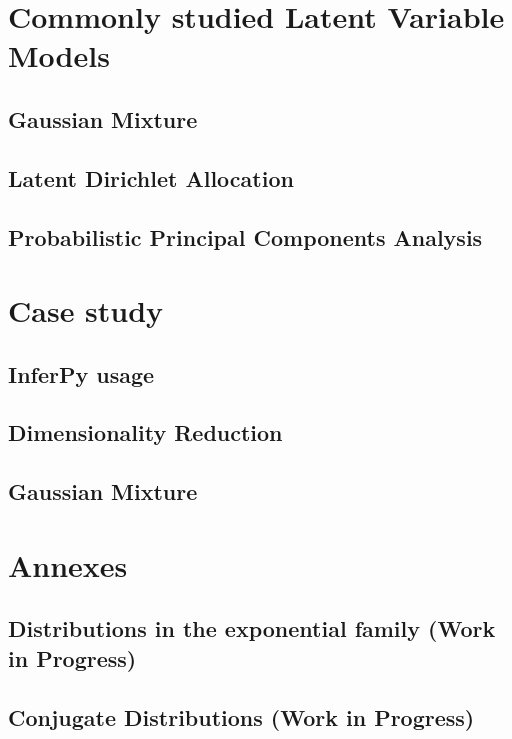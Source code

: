 \documentclass[twoside,openright,titlepage,numbers=noenddot,openany,headinclude,footinclude=true, cleardoublepage=empty,abstractoff,BCOR=5mm,paper=a4,fontsize=11pt, dvipsnames]{scrreprt}
\begin{document}
\part{Commonly studied Latent Variable Models}

\chapter{Gaussian Mixture}\label{ch:lvm_gm}


\chapter{Latent Dirichlet Allocation}


\chapter{Probabilistic Principal Components Analysis}


\ctparttext{
  \color{black}
  \begin{center}
    
  \end{center}
}
\part{Case study}

\chapter{InferPy usage}


\chapter{Dimensionality Reduction}

\chapter{Gaussian Mixture}


\ctparttext{
  \color{black}
  \begin{center}

  \end{center}
}
\part{Annexes}

\appendix
\chapter{Distributions in the exponential family (Work in Progress)}\label{ap:exp_fam}


\chapter{Conjugate Distributions (Work in Progress)}\label{ap:conj_distr}



\clearpage
\printglossary[title={Notation}]
\glsaddallunused

\clearpage
\nocite{*}


\end{document}

